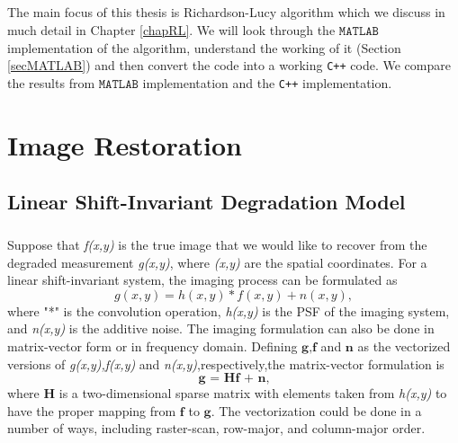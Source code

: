 \documentclass[a4paper]{book}
\begin{document}
	\paragraph*{} The main focus of this thesis is Richardson-Lucy algorithm which we discuss in much detail in Chapter \ref{chapRL}. We will look through the $ \mathtt{MATLAB} $ implementation of the algorithm, understand the working of it (Section \ref{secMATLAB}) and then convert the code into a working \texttt{C++} code. We compare the results from $ \mathtt{MATLAB} $ implementation and the \texttt{C++} implementation.
	
	
	\chapter[\LARGE Image Restoration]{Image Restoration}\label{chapIR}
	\thispagestyle{empty}

	\section{\Large Linear Shift-Invariant Degradation Model}\label{secLSImodel}
	
	\paragraph*{}Suppose that \textit{f(x,y)} is the true image that we would like to recover from the degraded measurement \textit{g(x,y)}, where \textit{(x,y)} are the spatial coordinates. For a linear shift-invariant system, the imaging process can be formulated as 
	\begin{equation}
	\label{eq3.1}
	g(x,y) = h(x,y) * f(x,y) + n(x,y),
	\end{equation}
	where "*" is the convolution operation, \textit{h(x,y)} is the PSF of the imaging system, and \textit{n(x,y)} is the additive noise. The imaging formulation can also be done in matrix-vector form or in frequency domain. Defining $\textbf{g,f}$ and $\textbf{n}$ as the vectorized versions of \textit{g(x,y),f(x,y)} and \textit{n(x,y)},respectively,the matrix-vector formulation is
	\begin{equation}
	\label{eq3.2}
	\textbf{g = Hf + n,}
	\end{equation}
	where \textbf{H} is a two-dimensional sparse matrix with elements taken from \textit{h(x,y)} to have the proper mapping from $ \textbf{f} $ to $ \textbf{g} $. The vectorization could be done in a number of ways, including raster-scan, row-major, and column-major order.
\end{document}
